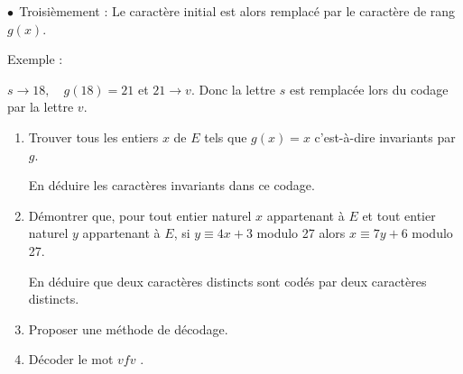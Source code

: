 \documentclass[10pt]{article}
\begin{document}
$\bullet~~$Troisièmement : Le caractère initial est alors remplacé par le caractère de rang $g(x)$.
 
Exemple :
 
$s \to 18, \quad  g(18) = 21$ et $21 \to v$. Donc la lettre $s$ est remplacée lors du codage par la lettre $v$.

\bigskip
 
\begin{enumerate}
\item Trouver tous les entiers $x$ de $E$ tels que $g(x) = x$ c'est-à-dire invariants par $g$.

En déduire les caractères invariants dans ce codage. 
\item Démontrer que, pour tout entier naturel $x$ appartenant à $E$ et tout entier naturel $y$ appartenant à $E$, si $y \equiv 4x + 3$  modulo 27 alors $x \equiv 7y + 6$ modulo 27.
 
En déduire que deux caractères distincts sont codés par deux caractères distincts. 
\item Proposer une méthode de décodage. 
\item Décoder le mot \og $vfv$ \fg. 
\end{enumerate}
\end{document}
